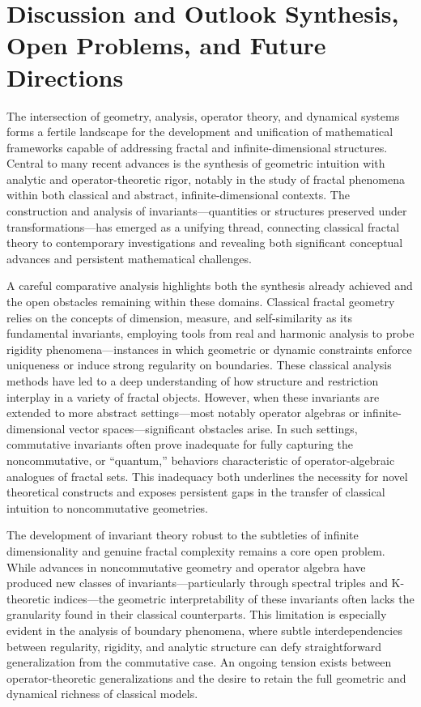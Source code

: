 \documentclass[sigconf]{acmart}
\begin{document}
\section{Discussion and Outlook Synthesis, Open Problems, and Future Directions}

The intersection of geometry, analysis, operator theory, and dynamical systems forms a fertile landscape for the development and unification of mathematical frameworks capable of addressing fractal and infinite-dimensional structures. Central to many recent advances is the synthesis of geometric intuition with analytic and operator-theoretic rigor, notably in the study of fractal phenomena within both classical and abstract, infinite-dimensional contexts. The construction and analysis of invariants—quantities or structures preserved under transformations—has emerged as a unifying thread, connecting classical fractal theory to contemporary investigations and revealing both significant conceptual advances and persistent mathematical challenges.

A careful comparative analysis highlights both the synthesis already achieved and the open obstacles remaining within these domains. Classical fractal geometry relies on the concepts of dimension, measure, and self-similarity as its fundamental invariants, employing tools from real and harmonic analysis to probe rigidity phenomena—instances in which geometric or dynamic constraints enforce uniqueness or induce strong regularity on boundaries. These classical analysis methods have led to a deep understanding of how structure and restriction interplay in a variety of fractal objects. However, when these invariants are extended to more abstract settings—most notably operator algebras or infinite-dimensional vector spaces—significant obstacles arise. In such settings, commutative invariants often prove inadequate for fully capturing the noncommutative, or ``quantum,'' behaviors characteristic of operator-algebraic analogues of fractal sets. This inadequacy both underlines the necessity for novel theoretical constructs and exposes persistent gaps in the transfer of classical intuition to noncommutative geometries.

The development of invariant theory robust to the subtleties of infinite dimensionality and genuine fractal complexity remains a core open problem. While advances in noncommutative geometry and operator algebra have produced new classes of invariants—particularly through spectral triples and K-theoretic indices—the geometric interpretability of these invariants often lacks the granularity found in their classical counterparts. This limitation is especially evident in the analysis of boundary phenomena, where subtle interdependencies between regularity, rigidity, and analytic structure can defy straightforward generalization from the commutative case. An ongoing tension exists between operator-theoretic generalizations and the desire to retain the full geometric and dynamical richness of classical models.
\end{document}
